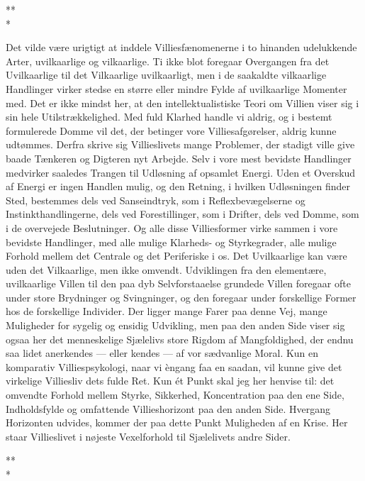 \documentclass[12pt,a4paper,openany]{book}
\newcommand{\opage}[1]{\marginnote{\footnotesize\textit{[#1]}}}
\newcommand{\stjerner}{\begin{center}*\hspace{0.4em}*\\[-0.9ex]*\end{center}}   %
\begin{document}
\stjerner

Det vilde være urigtigt at inddele Villiesfænomenerne i to
hinanden udelukkende Arter, uvilkaarlige og vilkaarlige. Ti
ikke blot foregaar Overgangen fra det Uvilkaarlige til det Vilkaarlige
uvilkaarligt, men i de saakaldte vilkaarlige Handlinger
virker stedse en større eller mindre Fylde af uvilkaarlige Momenter
med. Det er ikke mindst her, at den intellektualistiske
Teori om Villien viser sig i sin hele Utilstrækkelighed. Med
\setcounter{footnote}{0}%
\opage{41}fuld Klarhed handle vi aldrig, og i bestemt formulerede Domme
vil det, der betinger vore Villiesafgørelser, aldrig kunne udtømmes.
Derfra skrive sig Villieslivets mange Problemer, der
stadigt ville give baade Tænkeren og Digteren nyt Arbejde.
Selv i vore mest bevidste Handlinger medvirker saaledes Trangen
til Udløsning af opsamlet Energi. Uden et Overskud af Energi
er ingen Handlen mulig, og den Retning, i hvilken Udløsningen
finder Sted, bestemmes dels ved Sanseindtryk, som i Reflexbevægelserne
og Instinkthandlingerne, dels ved Forestillinger,
som i Drifter, dels ved Domme, som i de overvejede Beslutninger.
Og alle disse Villiesformer virke sammen i vore bevidste
Handlinger, med alle mulige Klarheds- og Styrkegrader,
alle mulige Forhold mellem det Centrale og det Periferiske i
os. Det Uvilkaarlige kan være uden det Vilkaarlige, men ikke
omvendt. Udviklingen fra den elementære, uvilkaarlige Villen
til den paa dyb Selvforstaaelse grundede Villen foregaar ofte
under store Brydninger og Svingninger, og den foregaar under
forskellige Former hos de forskellige Individer. Der ligger
mange Farer paa denne Vej, mange Muligheder for sygelig
og ensidig Udvikling, men paa den anden Side viser sig ogsaa
her det menneskelige Sjælelivs store Rigdom af Mangfoldighed,
der endnu saa lidet anerkendes --- eller kendes --- af vor sædvanlige
Moral. Kun en komparativ Villiespsykologi, naar vi
èngang faa en saadan, vil kunne give det virkelige Villiesliv
dets fulde Ret. Kun ét Punkt skal jeg her henvise til: det
omvendte Forhold mellem Styrke, Sikkerhed, Koncentration paa
den ene Side, Indholdsfylde og omfattende Villieshorizont paa
den anden Side. Hvergang Horizonten udvides, kommer der
paa dette Punkt Muligheden af en Krise. Her staar Villieslivet
i nøjeste Vexelforhold til Sjælelivets andre Sider.

\stjerner
\end{document}
